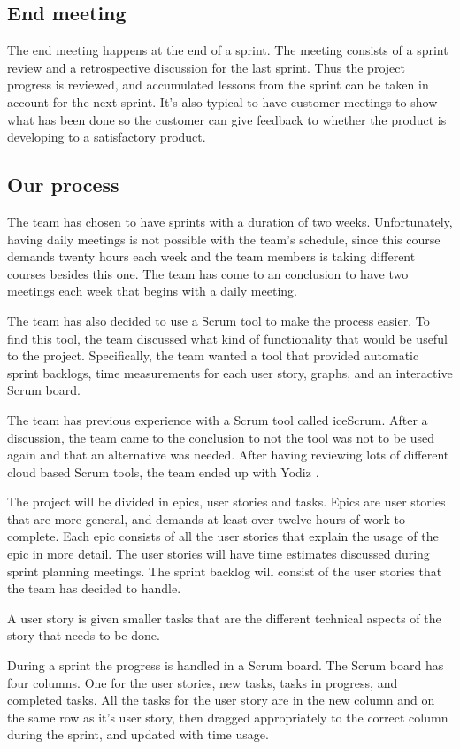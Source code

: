 \subsection{End meeting}
The end meeting happens at the end of a sprint. The meeting consists of a sprint review and a retrospective discussion for the last sprint.
Thus the project progress is reviewed, and accumulated lessons from the sprint can be taken in account for the next sprint.
It's also typical to have customer meetings to show what has been done so the customer can give feedback to whether the product is developing to a satisfactory product.

\subsection{Our process}
The team has chosen to have sprints with a duration of two weeks. Unfortunately, having daily meetings is not possible with the team's schedule,
since this course demands twenty hours each week and the team members is taking different courses besides this one.
The team has come to an conclusion to have two meetings each week that begins with a daily meeting.

The team has also decided to use a Scrum tool to make the process easier.
To find this tool, the team discussed what kind of functionality that would be useful to the project. Specifically, the team wanted a tool that provided automatic sprint backlogs, time measurements for each user story, graphs, and an interactive Scrum board.

The team has previous experience with a Scrum tool called iceScrum. After a discussion, the team came to the conclusion to not the tool was not to be used again and that an alternative was needed.
After having reviewing lots of different cloud based Scrum tools, the team ended up with Yodiz \cite{yodiz}.

The project will be divided in epics, user stories and tasks. Epics are user stories that are more general, and demands at least over twelve hours of work to complete. Each epic consists
of all the user stories that explain the usage of the epic in more detail. The user stories will have time estimates discussed during sprint planning meetings.
The sprint backlog will consist of the user stories that the team has decided to handle.

A user story is given smaller tasks that are the different technical aspects of the story that needs to be done.

During a sprint the progress is handled in a Scrum board. The Scrum board has four columns. One for the user stories, new tasks, tasks in progress, and completed tasks.
All the tasks for the user story are in the new column and on the same row as it's user story, then dragged appropriately to the correct column during the sprint, and updated with time usage.
